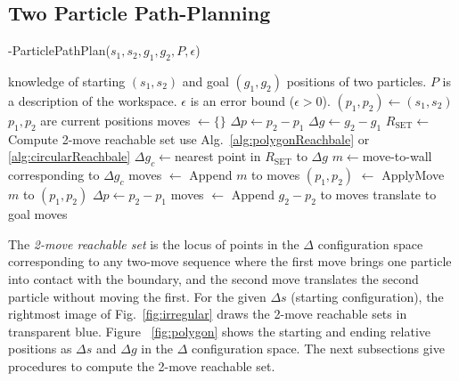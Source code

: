 \subsection{Two Particle Path-Planning}
\begin{algorithm}[htb]
\caption{ { -ParticlePathPlan}($s_1,s_2,g_1,g_2,P,\epsilon$)}\label{alg:optimalAlg}
\begin{algorithmic}[1]
\Require knowledge of starting $(s_1,s_2)$ and goal $(g_1,g_2)$ positions of  two particles. 
 $P$ is a description of the workspace. $\epsilon$ is an error bound ($\epsilon>0$).
 \State $(p_1,p_2) \gets (s_1,s_2) $ \Comment $p_1 , p_2$ are current positions
\State  moves $\gets \{\}$
 \State $\Delta p \gets p_2-p_1$
 \State $\Delta g \gets g_2-g_1$
\State $R_{\textrm{SET}}\gets$  Compute 2-move reachable set \newline
 \Comment  use Alg.~\ref{alg:polygonReachbale} or \ref{alg:circularReachbale}
\State $ \Delta g_c\gets $nearest point in $R_{\textrm{SET}}$ to $\Delta g$
\State $m \gets $move-to-wall corresponding to $\Delta g_c$
\State moves $\gets$ Append $m$ to moves
\State $(p_1, p_2)$ $\gets$ ApplyMove $m$ to $(p_1,p_2)$
 \State $\Delta p \gets p_2-p_1$
\EndWhile
\State moves $\gets$ Append $g_2-p_2$ to moves \Comment translate to goal
\State \Return moves
\end{algorithmic}
\end{algorithm}


  The \emph{2-move reachable set} is the locus of points in the $\Delta$ configuration space corresponding to any two-move sequence where the first move brings one particle into contact with the boundary, and the second move translates the second particle without moving the first.
 For the given $\Delta s$ (starting configuration), the rightmost image of Fig.~\ref{fig:irregular} draws the 2-move reachable sets  in transparent blue.
 Figure ~\ref{fig:polygon} shows the starting and ending relative positions as $\Delta s$ and $\Delta g$ in the $\Delta$ configuration space.  The next subsections give procedures to compute the 2-move reachable set.
 
